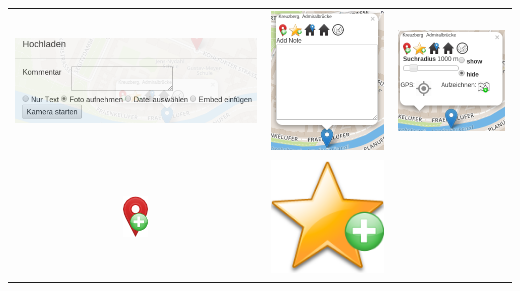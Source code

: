 \begin{table}[H]
  \begin{tabulary}{\columnwidth}{ C C C }
	\includegraphics[scale=0.5]{bilder/screenshots/menu_arbeitsmarker_upload.png} &
	\includegraphics[scale=0.5]{bilder/screenshots/menu_arbeitsmarker_bookmark.png} &
	\includegraphics[scale=0.5]{bilder/screenshots/menu_arbeitsmarker_radar.png} \\
	\includegraphics[scale=0.55]{bilder/icons/add-marker.png} &
	\includegraphics[scale=0.15]{bilder/icons/add-bookmark.png} &

\end{tabulary}
\end{table}
